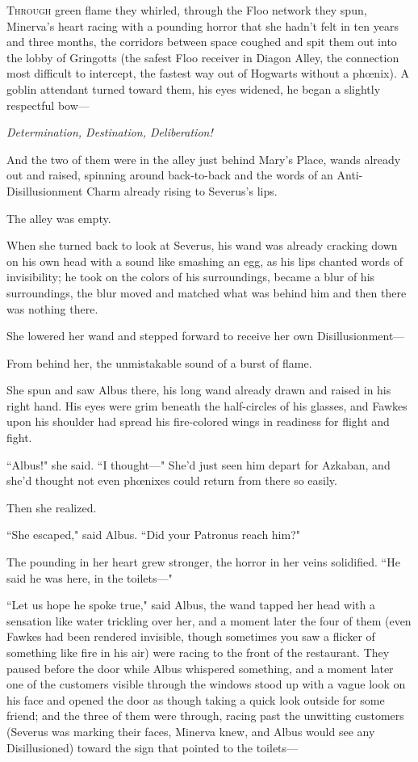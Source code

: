 
\lettrine{T}{hrough} green flame they whirled, through the Floo network they spun, Minerva's heart racing with a pounding horror that she hadn't felt in ten years and three months, the corridors between space coughed and spit them out into the lobby of Gringotts (the safest Floo receiver in Diagon Alley, the connection most difficult to intercept, the fastest way out of Hogwarts without a phœnix). A goblin attendant turned toward them, his eyes widened, he began a slightly respectful bow—

\emph{Determination, Destination, Deliberation!}

And the two of them were in the alley just behind Mary's Place, wands already out and raised, spinning around back-to-back and the words of an Anti-Disillusionment Charm already rising to Severus's lips.

The alley was empty.

When she turned back to look at Severus, his wand was already cracking down on his own head with a sound like smashing an egg, as his lips chanted words of invisibility; he took on the colors of his surroundings, became a blur of his surroundings, the blur moved and matched what was behind him and then there was nothing there.

She lowered her wand and stepped forward to receive her own Disillusionment—

From behind her, the unmistakable sound of a burst of flame.

She spun and saw Albus there, his long wand already drawn and raised in his right hand. His eyes were grim beneath the half-circles of his glasses, and Fawkes upon his shoulder had spread his fire-colored wings in readiness for flight and fight.

``Albus!" she said. ``I thought—" She'd just seen him depart for Azkaban, and she'd thought not even phœnixes could return from there so easily.

Then she realized.

``She escaped," said Albus. ``Did your Patronus reach him?"

The pounding in her heart grew stronger, the horror in her veins solidified. ``He said he was here, in the toilets—"

``Let us hope he spoke true," said Albus, the wand tapped her head with a sensation like water trickling over her, and a moment later the four of them (even Fawkes had been rendered invisible, though sometimes you saw a flicker of something like fire in his air) were racing to the front of the restaurant. They paused before the door while Albus whispered something, and a moment later one of the customers visible through the windows stood up with a vague look on his face and opened the door as though taking a quick look outside for some friend; and the three of them were through, racing past the unwitting customers (Severus was marking their faces, Minerva knew, and Albus would see any Disillusioned) toward the sign that pointed to the toilets—

